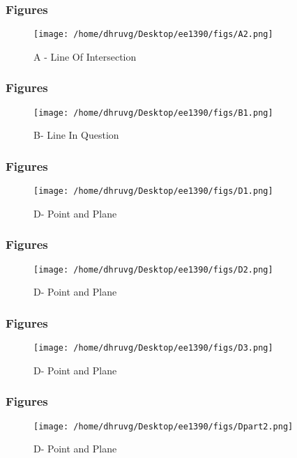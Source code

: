 \documentclass{beamer}
\begin{document}
\begin{frame}
\frametitle{Figures}
\begin{figure}[H]
    \texttt{[image: /home/dhruvg/Desktop/ee1390/figs/A2.png]}
    \caption{A - Line Of Intersection}
    \label{A3}
\end{figure}
\end{frame}
 

\begin{frame}
\frametitle{Figures}
\begin{figure}[H]
    \texttt{[image: /home/dhruvg/Desktop/ee1390/figs/B1.png]}
    \caption{B- Line In Question}
    \label{B1}
\end{figure}
\end{frame}


\begin{frame}
\frametitle{Figures}
\begin{figure}[H]
    \texttt{[image: /home/dhruvg/Desktop/ee1390/figs/D1.png]}
    \caption{D- Point and Plane}
    \label{D1}
\end{figure}
\end{frame}


\begin{frame}
\frametitle{Figures}
\begin{figure}[H]
    \texttt{[image: /home/dhruvg/Desktop/ee1390/figs/D2.png]}
    \caption{D- Point and Plane}
    \label{D2}
\end{figure}
\end{frame}


\begin{frame}
\frametitle{Figures}
\begin{figure}[H]
    \texttt{[image: /home/dhruvg/Desktop/ee1390/figs/D3.png]}
    \caption{D- Point and Plane}
    \label{D3}
\end{figure}
\end{frame}

\begin{frame}
\frametitle{Figures}
\begin{figure}[H]
    \texttt{[image: /home/dhruvg/Desktop/ee1390/figs/Dpart2.png]}
    \caption{D- Point and Plane}
    \label{D4}
\end{figure}
\end{frame}
\end{document}
